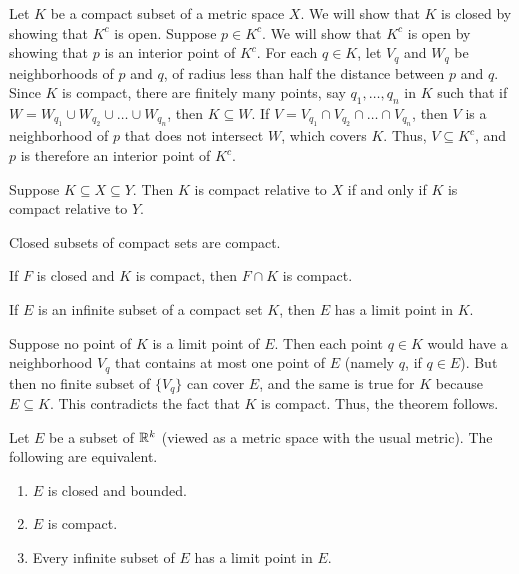 \documentclass{mathnotes}
\begin{document}
\begin{pf}
  Let $K$ be a compact subset of a metric space $X$. We will show that $K$ is
  closed by showing that $K^c$ is open. Suppose $p\in K^c$. We will show that
  $K^c$ is open by showing that $p$ is an interior point of $K^c$. For each
  $q\in K$, let $V_q$ and $W_q$ be neighborhoods of $p$ and $q$, of radius less
  than half the distance between $p$ and $q$. Since $K$ is compact, there are
  finitely many points, say $q_1,\ldots,q_n$ in $K$ such that if $W=W_{q_1}\cup
  W_{q_2}\cup\ldots\cup W_{q_n}$, then $K\subseteq W$. If $V=V_{q_1}\cap
  V_{q_2}\cap\ldots\cap V_{q_n}$, then $V$ is a neighborhood of $p$ that does
  not intersect $W$, which covers $K$. Thus, $V\subseteq K^c$, and $p$ is
  therefore an interior point of $K^c$.
\end{pf}

\begin{prop}
  Suppose $K\subseteq X\subseteq Y$. Then $K$ is compact relative to $X$ if and
  only if $K$ is compact relative to $Y$.
\end{prop}

\begin{prop}
  Closed subsets of compact sets are compact.
\end{prop}

\begin{prop}
  If $F$ is closed and $K$ is compact, then $F\cap K$ is compact.
\end{prop}

\begin{prop}
  If $E$ is an infinite subset of a compact set $K$, then $E$ has a limit point
  in $K$.
\end{prop}

\begin{pf}
  Suppose no point of $K$ is a limit point of $E$. Then each point $q\in K$
  would have a neighborhood $V_q$ that contains at most one point of $E$
  (namely $q$, if $q\in E$). But then no finite subset of $\{V_q\}$ can cover
  $E$, and the same is true for $K$ because $E\subseteq K$. This contradicts
  the fact that $K$ is compact. Thus, the theorem follows.
\end{pf}

\begin{bthm}
  Let $E$ be a subset of $\mathbb{R}^k$ (viewed as a metric space with the usual
  metric). The following are equivalent.
  \begin{enumerate}
    \item $E$ is closed and bounded.
    \item $E$ is compact.
    \item Every infinite subset of $E$ has a limit point in $E$.
  \end{enumerate}
\end{bthm}
\end{document}
